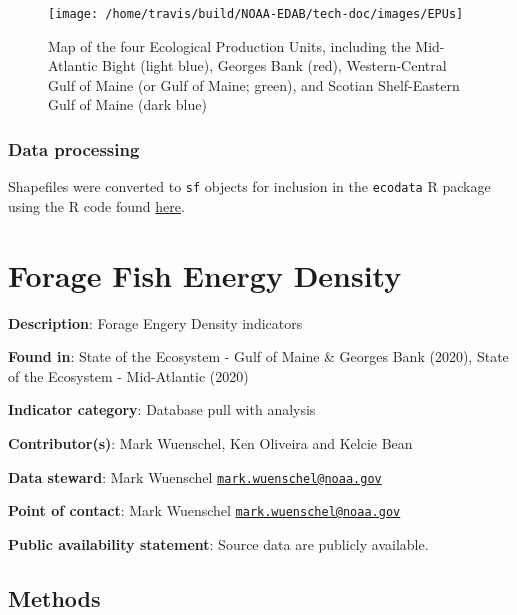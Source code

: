 \documentclass[
]{book}
\begin{document}
\begin{figure}

{\centering \texttt{[image: /home/travis/build/NOAA-EDAB/tech-doc/images/EPUs]} 

}

\caption{Map of the four Ecological Production Units, including the Mid-Atlantic Bight (light blue), Georges Bank (red), Western-Central Gulf of Maine (or Gulf of Maine; green), and Scotian Shelf-Eastern Gulf of Maine (dark blue)}\label{fig:EPUmap}
\end{figure}

\hypertarget{data-processing-10}{%
\subsection{Data processing}\label{data-processing-10}}

Shapefiles were converted to \texttt{sf} objects for inclusion in the \texttt{ecodata} R package using the R code found \href{https://raw.githubusercontent.com/NOAA-EDAB/ecodata/master/data-raw/get_epu_sf.R}{here}.

\hypertarget{forage-fish-energy-density}{%
\chapter{Forage Fish Energy Density}\label{forage-fish-energy-density}}

\textbf{Description}: Forage Engery Density indicators

\textbf{Found in}: State of the Ecosystem - Gulf of Maine \& Georges Bank (2020), State of the Ecosystem - Mid-Atlantic (2020)

\textbf{Indicator category}: Database pull with analysis

\textbf{Contributor(s)}: Mark Wuenschel, Ken Oliveira and Kelcie Bean

\textbf{Data steward}: Mark Wuenschel \href{mailto:mark.wuenschel@noaa.gov}{\nolinkurl{mark.wuenschel@noaa.gov}}

\textbf{Point of contact}: Mark Wuenschel \href{mailto:mark.wuenschel@noaa.gov}{\nolinkurl{mark.wuenschel@noaa.gov}}

\textbf{Public availability statement}: Source data are publicly available.

\hypertarget{methods-15}{%
\section{Methods}\label{methods-15}}
\end{document}
